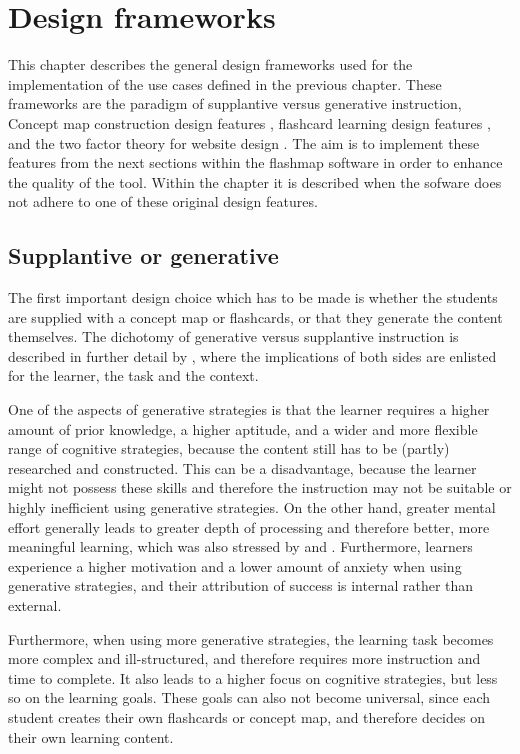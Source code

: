\chapter{Design frameworks}
\label{ch:frameworks}

This chapter describes the general design frameworks used for the implementation of the use cases defined in the previous chapter. These frameworks are the paradigm of supplantive versus generative instruction, Concept map construction design features \cite{constructcmaps}, flashcard learning design features \cite{nakata}, and the two factor theory for website design \cite{websitedesign}. The aim is to implement these features from the next sections within the flashmap software in order to enhance the quality of the tool. Within the  chapter it is described when the sofware does not adhere to one of these original design features.

    \section{Supplantive or generative}
    \label{sec:suppgen}

The first important design choice which has to be made is whether the students are supplied with a concept map or flashcards, or that they generate the content themselves. The dichotomy of generative versus supplantive instruction is described in further detail by , where the implications of both sides are enlisted for the learner, the task and the context.

One of the aspects of generative strategies is that the learner requires a higher amount of prior knowledge, a higher aptitude, and a wider and more flexible range of cognitive strategies, because the content still has to be (partly) researched and constructed. This can be a disadvantage, because the learner might not possess these skills and therefore the instruction may not be suitable or highly inefficient using generative strategies. On the other hand, greater mental effort generally leads to greater depth of processing and therefore better, more meaningful learning, which was also stressed by  and . Furthermore, learners experience a higher motivation and a lower amount of anxiety when using generative strategies, and their attribution of success is internal rather than external. 

Furthermore, when using more generative strategies, the learning task becomes more complex and ill-structured, and therefore requires more instruction and time to complete. It also leads to a higher focus on cognitive strategies, but less so on the learning goals. These goals can also not become universal, since each student creates their own flashcards or concept map, and therefore decides on their own learning content.

